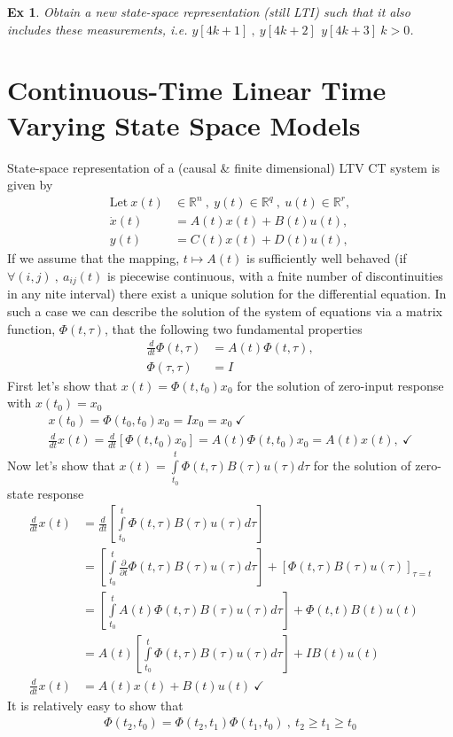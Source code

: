 \documentclass[twoside]{article}
\newtheorem{exmp}[theorem]{Ex}
\begin{document}
\begin{exmp}
	Obtain a new state-space representation (still LTI) such that it also includes these measurements, i.e. $y[4k+1] \ , \ y[4k+2] \, \ y[4k+3] \ k > 0$.
\end{exmp}

\newpage

\section{Continuous-Time Linear Time Varying State Space Models} 

State-space representation of a (causal \& finite dimensional) LTV CT system is given by
%
\begin{align*}
  \mathrm{Let} \ x(t) &\in \mathbb{R}^n \ , \ y(t) \in \mathbb{R}^q \ ,\  u(t) \in \mathbb{R}^r , \\
  \dot{x}(t) &= A(t) x(t) + B(t) u(t) , \\
  y(t) &= C(t) x(t) + D(t) u(t) , 
\end{align*}
%
If we assume that the mapping, $t \mapsto A(t)$ is sufficiently well behaved (if $\forall (i,j) \ , \ a_{ij}(t)$ is piecewise continuous, with a fnite number of discontinuities in any nite interval) there exist a unique solution for the differential equation. In such a case we can describe the solution of the system of equations via a matrix function, $\Phi(t , \tau)$, that the following 
two fundamental properties
%
\begin{align*}
	\frac{d}{dt} \Phi(t , \tau) &= A(t) \Phi(t , \tau) ,
	\\
	\Phi(\tau , \tau) &= I
\end{align*}
%
First let's show that $x(t) = \Phi(t , t_0) x_0$ for the solution of zero-input response with $x(t_0) = x_0$
%
\begin{align*}
	x(t_0) = \Phi(t_0 , t_0) x_0 = I x_0 = x_0 \ \checkmark
	\\
	\frac{d}{dt} x(t) = \frac{d}{dt} \left[ \Phi(t , t_0) x_0 \right] = A(t) \Phi(t , t_0 ) x_0 = A(t) x(t) , \ \checkmark
\end{align*}
%
Now let's show that $x(t) = \int\limits_{t_0}^{t} \Phi(t , \tau) B(\tau) u(\tau) d\tau$ for the solution of zero-state response 
%
\begin{align*}
	\frac{d}{dt} x(t) &= \frac{d}{dt} \left[ \int\limits_{t_0}^{t} \Phi(t , \tau) B(\tau) u(\tau) d\tau \right]
	\\
	&= \left[ \int\limits_{t_0}^{t} \frac{\partial}{\partial t} \Phi(t , \tau) B(\tau) u(\tau) d\tau \right] + \left[ \Phi(t , \tau) B(\tau) u(\tau) \right]_{\tau = t}
	\\
	&= \left[ \int\limits_{t_0}^{t} A(t) \Phi(t , \tau) B(\tau) u(\tau) d\tau \right] + \Phi(t , t) B(t) u(t) 
	\\
	&= A(t) \left[ \int\limits_{t_0}^{t} \Phi(t , \tau) B(\tau) u(\tau) d\tau \right] + I B(t) u(t) 
	\\
	\frac{d}{dt} x(t) &= A(t) x(t) + B(t) u(t) \ \checkmark
\end{align*}
%
It is relatively easy to show that 
%
\begin{align*}
	\Phi(t_2 , t_0) = \Phi(t_2 , t_1) \Phi(t_1 , t_0) \ , \ t_2 \geq t_1 \geq t_0
\end{align*}
\end{document}
